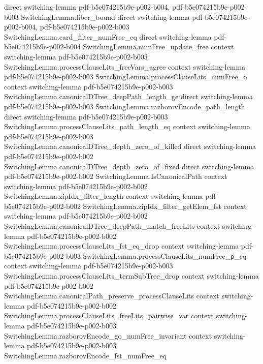 \begin{theorem}
  {direct}
  {switching-lemma}
  {pdf-b5e074215b9e-p002-b004,
    pdf-b5e074215b9e-p002-b003}
\proofstep
  {SwitchingLemma.fiber_bound}
  {direct}
  {switching-lemma}
  {pdf-b5e074215b9e-p002-b004,
    pdf-b5e074215b9e-p002-b003}
\proofstep
  {SwitchingLemma.card_filter_numFree_eq}
  {direct}
  {switching-lemma}
  {pdf-b5e074215b9e-p002-b004}
\proofstep
  {SwitchingLemma.numFree_update_free}
  {context}
  {switching-lemma}
  {pdf-b5e074215b9e-p002-b003}
\proofstep
  {SwitchingLemma.processClauseLits_freeVars_agree}
  {context}
  {switching-lemma}
  {pdf-b5e074215b9e-p002-b003}
\proofstep
  {SwitchingLemma.processClauseLits_numFree_σ}
  {context}
  {switching-lemma}
  {pdf-b5e074215b9e-p002-b003}
\proofstep
  {SwitchingLemma.canonicalDTree_deepPath_length_ge}
  {direct}
  {switching-lemma}
  {pdf-b5e074215b9e-p002-b003}
\proofstep
  {SwitchingLemma.razborovEncode_path_length}
  {direct}
  {switching-lemma}
  {pdf-b5e074215b9e-p002-b003}
\proofstep
  {SwitchingLemma.processClauseLits_path_length_eq}
  {context}
  {switching-lemma}
  {pdf-b5e074215b9e-p002-b003}
\proofstep
  {SwitchingLemma.canonicalDTree_depth_zero_of_killed}
  {direct}
  {switching-lemma}
  {pdf-b5e074215b9e-p002-b002}
\proofstep
  {SwitchingLemma.canonicalDTree_depth_zero_of_fixed}
  {direct}
  {switching-lemma}
  {pdf-b5e074215b9e-p002-b002}
\proofstep
  {SwitchingLemma.IsCanonicalPath}
  {context}
  {switching-lemma}
  {pdf-b5e074215b9e-p002-b002}
\proofstep
  {SwitchingLemma.zipIdx_filter_length}
  {context}
  {switching-lemma}
  {pdf-b5e074215b9e-p002-b002}
\proofstep
  {SwitchingLemma.zipIdx_filter_getElem_fst}
  {context}
  {switching-lemma}
  {pdf-b5e074215b9e-p002-b002}
\proofstep
  {SwitchingLemma.canonicalDTree_deepPath_match_freeLits}
  {context}
  {switching-lemma}
  {pdf-b5e074215b9e-p002-b002}
\proofstep
  {SwitchingLemma.processClauseLits_fst_eq_drop}
  {context}
  {switching-lemma}
  {pdf-b5e074215b9e-p002-b003}
\proofstep
  {SwitchingLemma.processClauseLits_numFree_ρ_eq}
  {context}
  {switching-lemma}
  {pdf-b5e074215b9e-p002-b003}
\proofstep
  {SwitchingLemma.processClauseLits_termSubTree_drop}
  {context}
  {switching-lemma}
  {pdf-b5e074215b9e-p002-b002}
\proofstep
  {SwitchingLemma.canonicalPath_preserve_processClauseLits}
  {context}
  {switching-lemma}
  {pdf-b5e074215b9e-p002-b002}
\proofstep
  {SwitchingLemma.processClauseLits_freeLits_pairwise_var}
  {context}
  {switching-lemma}
  {pdf-b5e074215b9e-p002-b003}
\proofstep
  {SwitchingLemma.razborovEncode_go_numFree_invariant}
  {context}
  {switching-lemma}
  {pdf-b5e074215b9e-p002-b003}
\proofstep
  {SwitchingLemma.razborovEncode_fst_numFree_eq}

\end{theorem}
